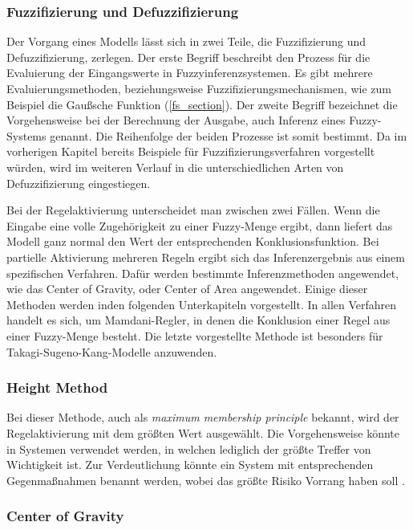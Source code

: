 \subsubsection{Fuzzifizierung und Defuzzifizierung}\label{FDF} 

Der Vorgang eines Modells lässt sich in zwei Teile, die Fuzzifizierung und Defuzzifizierung, zerlegen. Der erste Begriff beschreibt den Prozess für die Evaluierung der Eingangswerte in Fuzzyinferenzsystemen. Es gibt mehrere Evaluierungsmethoden, beziehungsweise Fuzzifizierungsmechanismen, wie zum Beispiel die Gaußsche Funktion (\ref{fs_section}). Der zweite Begriff bezeichnet die Vorgehensweise bei der Berechnung der Ausgabe, auch Inferenz eines Fuzzy-Systems genannt. Die Reihenfolge der beiden Prozesse ist somit bestimmt. Da im vorherigen Kapitel bereits Beispiele für Fuzzifizierungsverfahren vorgestellt würden, wird im weiteren Verlauf in die unterschiedlichen Arten von Defuzzifizierung eingestiegen.

Bei der Regelaktivierung unterscheidet man zwischen zwei Fällen. Wenn die Eingabe eine volle Zugehörigkeit zu einer Fuzzy-Menge ergibt, dann liefert das Modell ganz normal den Wert der entsprechenden Konklusionsfunktion. Bei partielle Aktivierung mehreren Regeln ergibt sich das Inferenzergebnis aus einem spezifischen Verfahren. Dafür werden bestimmte Inferenzmethoden angewendet, wie das Center of Gravity, oder Center of Area angewendet. Einige dieser Methoden werden inden folgenden Unterkapiteln vorgestellt. In allen Verfahren handelt es sich, um Mamdani-Regler, in denen die Konklusion einer Regel aus einer Fuzzy-Menge besteht. Die letzte vorgestellte Methode ist besonders für Takagi-Sugeno-Kang-Modelle anzuwenden.

\subsubsection{Height Method}
Bei dieser Methode, auch als \textit{maximum membership principle} bekannt, wird der Regelaktivierung mit dem größten Wert ausgewählt. Die Vorgehensweise könnte in Systemen verwendet werden, in welchen lediglich der größte Treffer von Wichtigkeit ist. Zur Verdeutlichung könnte ein System mit entsprechenden Gegenmaßnahmen benannt werden, wobei das größte Risiko Vorrang haben soll \cite{SCTemassi:01}.

\subsubsection{Center of Gravity}

